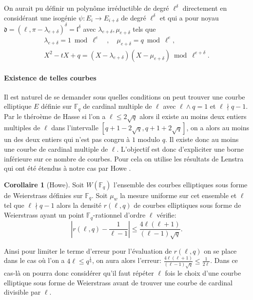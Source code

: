 \documentclass[10pt,a4paper]{book}
\theoremstyle{plain}
\theoremstyle{definition}
\theoremstyle{definition}
\newtheorem{cor}[thm]{Corollaire}
\theoremstyle{definition}
\theoremstyle{definition}
\theoremstyle{remark}
\theoremstyle{remark}
\theoremstyle{definition}
\begin{document}
On aurait pu définir un polynôme irréductible de degré $\ell^{\delta}$ directement en considérant une isogénie $\psi:E_i \to E_{i+\delta}$ de degré $\ell^{\delta}$ et qui a pour noyau $\mathfrak{d}=(\ell,\pi-\lambda_{e+\delta})^{\delta}=\mathfrak{l}^{\delta}$ avec $\lambda_{e+\delta}, \mu_{e+\delta}$ tels que 
\begin{align*}
\lambda_{e+\delta}=1 \bmod \ell^{e} \quad , \quad \mu_{e+\delta}=q \bmod \ell^e, \\
X^2-tX+q = (X-\lambda_{e+\delta})(X-\mu_{e+\delta}) \bmod \ell^{e+\delta} .
\end{align*}

\paragraph{Existence de telles courbes}
Il est naturel de se demander sous quelles conditions on peut trouver une courbe elliptique $E$ définie sur $\mathbb{F}_q$ de cardinal multiple de $\ell$ avec $\ell \wedge q =1$ et $\ell \nmid q-1$. Par le théroème de Hasse si l'on a $\ell \leqslant 2\sqrt{q}$ alors il existe au moins deux entiers multiples de $\ell$ dans l'intervalle $[q+1-2\sqrt{q}, q+1+2\sqrt{q} ] $, on a alors au moins un des deux entiers qui n'est pas congru à $1$ modulo $q$. Il existe donc au moins une courbe de cardinal multiple de $\ell$. L'objectif est donc d'expliciter une borne inférieure sur ce nombre de courbes. Pour cela on utilise les résultats de Lenstra \cite{lenstra1987} qui ont été étendus à notre cas par Howe \cite{howe1993}.

\begin{cor}[Howe]
\label{cor:Howe:densite}
Soit $W(\mathbb{F}_q)$ l'ensemble des courbes elliptiques sous forme de Weierstrass définies sur $\mathbb{F}_q$. Soit $\mu_w$ la mesure uniforme sur cet ensemble et $\ell$  tel que $\ell \nmid q-1$ alors la densité $r(\ell,q)$ de courbes elliptiques sous forme de Weierstrass ayant un point $\mathbb{F}_q$-rationnel d'ordre $\ell$ vérifie:
\begin{equation*}
|r(\ell,q)-\frac{1}{\ell-1}| \leqslant \frac{4\ell(\ell+1)}{(\ell-1)\sqrt{q}}.
\end{equation*}
\end{cor}
Ainsi pour limiter le terme d'erreur pour l'évaluation de $r(\ell,q)$ on se place dans le cas où l'on a $4\ell \leqslant q^{\frac{1}{4}}$, on aura alors l'erreur: $\frac{4\ell(\ell+1)}{(\ell-1)\sqrt{q}} \leqslant \frac{1}{2 \ell} $. Dans ce cas-là on pourra donc considérer qu'il faut répéter $\ell$ fois le choix d'une courbe elliptique sous forme de Weierstrass avant de trouver une courbe de cardinal divisible par $\ell$.
\end{document}
